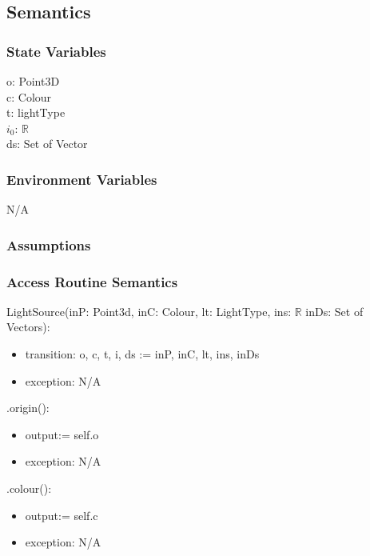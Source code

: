 \documentclass[12pt, titlepage]{article}
\begin{document}
\subsection{Semantics}
\subsubsection{State Variables}
o: Point3D \\ %
c: Colour \\
t: lightType \\
$i_{0}$: $\mathbb{R}$ \\
ds: Set of Vector \\ %

\subsubsection{Environment Variables}
N/A

\subsubsection{Assumptions}

\subsubsection{Access Routine Semantics}

\noindent LightSource(inP: Point3d, inC: Colour, lt: LightType, ins: 
$\mathbb{R}$ inDs: Set of Vectors):
\begin{itemize}
	\item transition: o, c, t, i, ds := inP, inC, lt, ins, inDs \\
	\item exception: N/A\\
\end{itemize}

\noindent .origin():
\begin{itemize}
	\item output:= self.o\\
	\item exception: N/A\\
\end{itemize}

\noindent .colour():
\begin{itemize}
	\item output:= self.c\\
	\item exception: N/A\\
\end{itemize}
\end{document}
